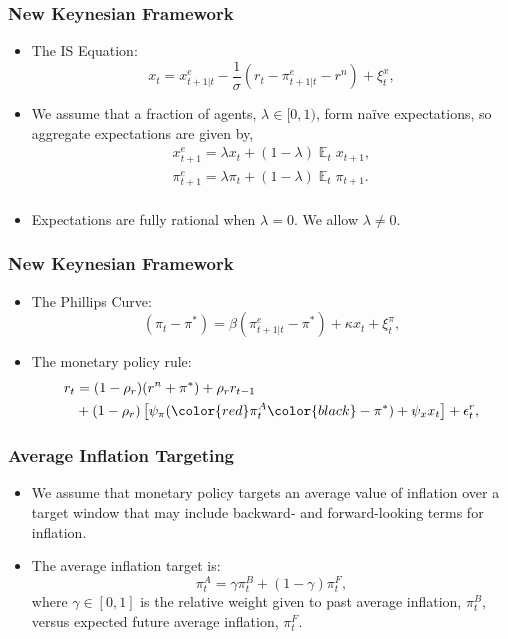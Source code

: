\documentclass{beamer}
\DeclareMathOperator{\E}{\mathbb{E}}
\begin{document}
\begin{frame}
	\frametitle{New Keynesian Framework}
	\begin{itemize}
		\item The IS Equation:
		\begin{equation}\label{eq:ISe}
			x_t = x_{t+1|t}^e - \frac{1}{\sigma} \left( r_t - \pi_{t+1|t}^e  - r^n  \right) + \xi_t^{x},
		\end{equation}
		\item We assume that a fraction of agents, $\lambda\in[0,1)$, form na\"ive expectations, so aggregate expectations are given by,
		\begin{equation}
			\begin{array}{c}
				x_{t+1}^e = \lambda x_t + (1-\lambda) \E_t x_{t+1}, \\ [1.5pc]
				\pi_{t+1}^e = \lambda \pi_t + (1-\lambda) \E_t \pi_{t+1}. \\
			\end{array}
		\end{equation}
		\item Expectations are fully rational when $\lambda=0$. We allow $\lambda \neq 0$.
	\end{itemize}
\end{frame}

\begin{frame}
	\frametitle{New Keynesian Framework}
	\begin{itemize}
		\item The Phillips Curve: 
		\begin{equation}\label{eq:PhillipsCurvee}
			(\pi_t - \pi^*) = \beta (\pi_{t+1|t}^e - \pi^*) + \kappa x_t + \xi_t^{\pi},
		\end{equation}
		\item The monetary policy rule:
		\begin{align}\label{eq:TaylorRule}
			r_t &= (1-\rho_r)(r^n + \pi^*) + \rho_r r_{t-1} \nonumber \\
				& + (1-\rho_r) \left[ \psi_\pi (\color{red}\pi_t^A \color{black} - \pi^*) + \psi_x x_t \right] + \epsilon_t^{r},
		\end{align}
	\end{itemize}
\end{frame}

\begin{frame}
	\frametitle{Average Inflation Targeting}
	\begin{itemize}
		\setlength{\itemsep}{1em}
		\item We assume that monetary policy targets an average value of inflation over a target window that may include backward- and forward-looking terms for inflation. 
		\item The average inflation target is:
		\begin{equation}
			\pi_t^A = \gamma \pi_t^B + (1-\gamma) \pi_t^F,
		\end{equation}
		where $\gamma \in [0,1]$ is the relative weight given to past average inflation, $\pi_t^B$, versus expected future average inflation, $\pi_t^F$.
	\end{itemize}
\end{frame}
\end{document}

